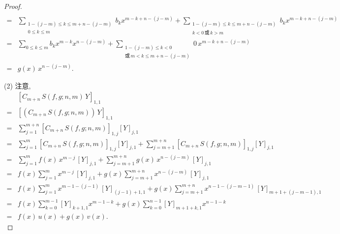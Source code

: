 \documentclass[../libro.tex]{subfiles}
\begin{document}
\begin{proof}
\begin{align*}
        \\
        = {} &
        \sum_{\substack{
                1-(j-m) \leq k \leq m+n-(j-m) \\
                0 \leq k \leq m
        }}
        {b_k x^{m-k+n-(j-m)}}
        +
        \sum_{\substack{
                1-(j-m) \leq k \leq m+n-(j-m) \\
                k < 0 \,\text{或}\, k > m
        }}
        {b_k x^{m-k+n-(j-m)}}
        \\
        = {} &
        \sum_{0 \leq k \leq m}
        {b_k x^{m-k} x^{n-(j-m)}}
        +
        \sum_{\substack{
                1-(j-m) \leq k < 0 \\
                \text{或}\, m < k \leq m+n-(j-m)
        }}
        {0\, x^{m-k+n-(j-m)}}
        \\
        = {} &
        g(x)\, x^{n-(j-m)}.
    \end{align*}

    (2)
    注意,
    \begin{align*}
        &
        [C_{m+n}\, S(f, g; n, m)\, Y]_{1,1}
        \\
        = {} &
        [(C_{m+n}\, S(f, g; n, m))\, Y]_{1,1}
        \\
        = {} &
        \sum_{j = 1}^{m+n}
        {[C_{m+n}\, S(f, g; n, m)]_{1,j} [Y]_{j,1}}
        \\
        = {} &
        \sum_{j = 1}^{m}
        {[C_{m+n}\, S(f, g; n, m)]_{1,j} [Y]_{j,1}}
        +
        \sum_{j = m+1}^{m+n}
        {[C_{m+n}\, S(f, g; n, m)]_{1,j} [Y]_{j,1}}
        \\
        = {} &
        \sum_{j = 1}^{m}
        {f(x)\, x^{m-j}\, [Y]_{j,1}}
        +
        \sum_{j = m+1}^{m+n}
        {g(x)\, x^{n-(j-m)}\, [Y]_{j,1}}
        \\
        = {} &
        f(x)
        \sum_{j = 1}^{m}
        {x^{m-j}\, [Y]_{j,1}}
        +
        g(x)
        \sum_{j = m+1}^{m+n}
        {x^{n-(j-m)}\, [Y]_{j,1}}
        \\
        = {} &
        f(x)
        \sum_{j = 1}^{m}
        {x^{m-1-(j-1)}\, [Y]_{(j-1)+1,1}}
        +
        g(x)
        \sum_{j = m+1}^{m+n}
        {x^{n-1-(j-m-1)}\, [Y]_{m+1+(j-m-1),1}}
        \\
        = {} &
        f(x)
        \sum_{k = 0}^{m-1}
        {[Y]_{k+1,1} x^{m-1-k}}
        +
        g(x)
        \sum_{k = 0}^{n-1}
        {[Y]_{m+1+k,1} x^{n-1-k}}
        \\
        = {} &
        f(x)\, u(x) + g(x)\, v(x).
    \end{align*}


\end{proof}
\end{document}
